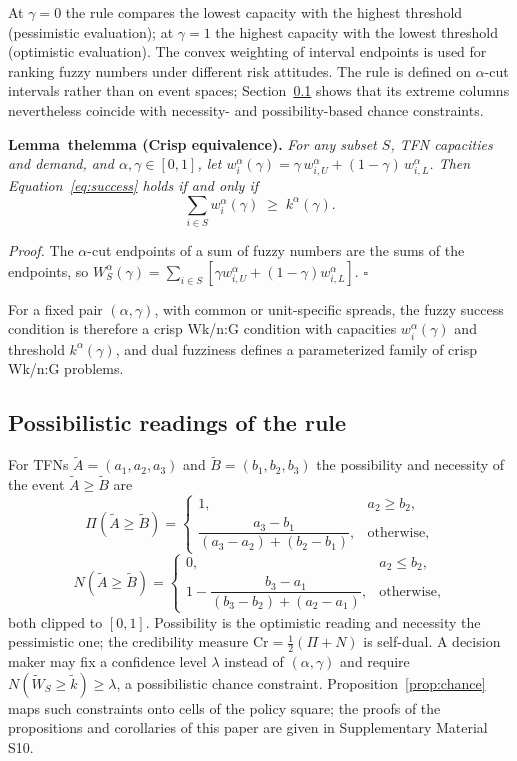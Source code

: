\documentclass[Review,sagev,times]{sagej}%
\newcounter{lemma}\newcounter{definition}\newcounter{proposition}\newcounter{corollary}\newcounter{theorem}\newcounter{remark}
\newcommand{\stmt}[3]{\refstepcounter{#1}\label{#2}#3~\csname the#1\endcsname}
\newcommand{\kag}{k^{\alpha}(\gamma)}\newcommand{\WS}{\tilde{W}_S}\newcommand{\Zsuf}{Z^{\mathrm{suf}}}
\begin{document}
At $\gamma=0$ the rule compares the lowest capacity with the highest threshold (pessimistic evaluation); at
$\gamma=1$ the highest capacity with the lowest threshold (optimistic evaluation). The convex weighting of
interval endpoints is used for ranking fuzzy numbers under different risk attitudes\cite{CamposGonzalez1989,KimPark1990,LiouWang1992}.
The rule is defined on $\alpha$-cut intervals rather than on event spaces\cite{Yang2008}; Section~\ref{sec:family}
shows that its extreme columns nevertheless coincide with necessity- and possibility-based chance constraints.

\textbf{\stmt{lemma}{lem:crisp_equiv}{Lemma} (Crisp equivalence).} \textit{For any subset $S$, TFN capacities and
demand, and $\alpha,\gamma\in[0,1]$, let $w_i^\alpha(\gamma)=\gamma\,w_{i,U}^\alpha+(1-\gamma)\,w_{i,L}^\alpha$.
Then Equation~\eqref{eq:success} holds if and only if}
\begin{equation}
\sum_{i \in S} w_i^\alpha(\gamma) \;\geq\; \kag.
\label{eq:crisp_equiv}
\end{equation}

\textit{Proof.} The $\alpha$-cut endpoints of a sum of fuzzy numbers are the sums of the endpoints, so
$W_S^\alpha(\gamma)=\sum_{i\in S}[\gamma w_{i,U}^\alpha+(1-\gamma)w_{i,L}^\alpha]$. $\square$

For a fixed pair $(\alpha,\gamma)$, with common or unit-specific spreads, the fuzzy success condition is
therefore a crisp Wk/n:G condition with capacities $w_i^\alpha(\gamma)$ and threshold $\kag$, and dual fuzziness
defines a parameterized family of crisp Wk/n:G problems.

\subsection{Possibilistic readings of the rule} \label{sec:family}
For TFNs $\tilde{A}=(a_1,a_2,a_3)$ and $\tilde{B}=(b_1,b_2,b_3)$ the possibility and necessity of the event
$\tilde{A}\ge\tilde{B}$ are\cite{DuboisPrade1988}
\begin{equation}
\Pi(\tilde{A}\ge\tilde{B}) =
\begin{cases}
1, & a_2 \ge b_2,\\
\dfrac{a_3-b_1}{(a_3-a_2)+(b_2-b_1)}, & \text{otherwise,}
\end{cases}
\end{equation}
\begin{equation}
N(\tilde{A}\ge\tilde{B}) =
\begin{cases}
0, & a_2 \le b_2,\\
1-\dfrac{b_3-a_1}{(b_3-b_2)+(a_2-a_1)}, & \text{otherwise,}
\end{cases}
\end{equation}
both clipped to $[0,1]$. Possibility is the optimistic reading and necessity the pessimistic one; the
credibility measure $\mathrm{Cr}=\tfrac{1}{2}(\Pi+N)$ is self-dual\cite{Liu2002}. A decision maker may fix a
confidence level $\lambda$ instead of $(\alpha,\gamma)$ and require $N(\WS\ge\tilde{k})\ge\lambda$, a
possibilistic chance constraint\cite{InuiguchiRamik2000}. Proposition~\ref{prop:chance} maps such constraints
onto cells of the policy square; the proofs of the propositions and corollaries of this paper are given in
Supplementary Material S10.
\end{document}
